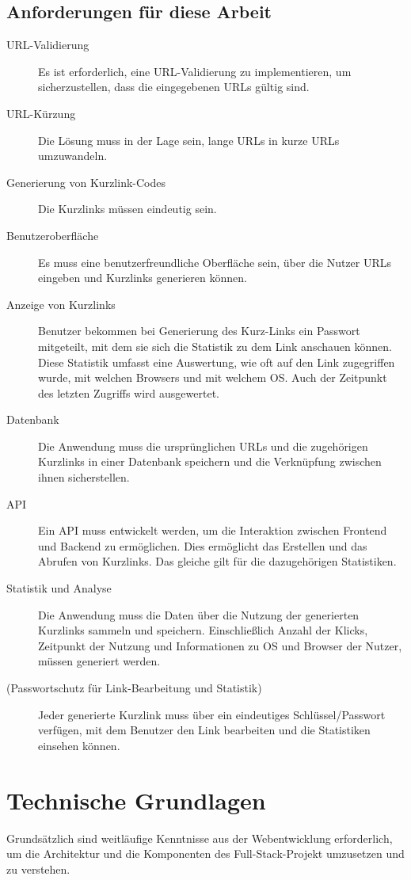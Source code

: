 \documentclass[a4paper,11pt,DIV=12,overfullrule=on]{scrreprt}%
\begin{document}
\section{Anforderungen für diese Arbeit}
\begin{description}
    \item[URL-Validierung] Es ist erforderlich, eine \ac{URL}-Validierung zu implementieren, um sicherzustellen, dass die eingegebenen \ac{URL}s gültig sind.
    \item[URL-Kürzung] Die Lösung muss in der Lage sein, lange \ac{URL}s in kurze \ac{URL}s umzuwandeln.
    \item[Generierung von Kurzlink-Codes] Die Kurzlinks müssen eindeutig sein.
    \item[Benutzeroberfläche] Es muss eine benutzerfreundliche Oberfläche sein, über die Nutzer \ac{URL}s eingeben und Kurzlinks generieren können.
    \item[Anzeige von Kurzlinks] Benutzer bekommen bei Generierung des Kurz-Links ein Passwort mitgeteilt, mit dem sie sich die Statistik zu dem Link anschauen können. Diese Statistik umfasst eine Auswertung, wie oft auf den Link zugegriffen wurde, mit welchen Browsers und mit welchem \ac{OS}. Auch der Zeitpunkt des letzten Zugriffs wird ausgewertet.
    \item[Datenbank] Die Anwendung muss die ursprünglichen \ac{URL}s und die zugehörigen Kurzlinks in einer Datenbank speichern und die Verknüpfung zwischen ihnen sicherstellen.
    \item[API] Ein \ac{API} muss entwickelt werden, um die Interaktion zwischen Frontend und Backend zu ermöglichen. Dies ermöglicht das Erstellen und das Abrufen von Kurzlinks. Das gleiche gilt für die dazugehörigen Statistiken.
    \item[Statistik und Analyse] Die Anwendung muss die Daten über die Nutzung der generierten Kurzlinks sammeln und speichern. Einschließlich Anzahl der Klicks, Zeitpunkt der Nutzung und Informationen zu \ac{OS} und Browser der Nutzer, müssen generiert werden.
    \item[(Passwortschutz für Link-Bearbeitung und Statistik)] Jeder generierte Kurzlink muss über ein eindeutiges Schlüssel/Passwort verfügen, mit dem Benutzer den Link bearbeiten und die Statistiken einsehen können.
\end{description}

\chapter{Technische Grundlagen}
Grundsätzlich sind weitläufige Kenntnisse aus der Webentwicklung erforderlich, um die Architektur und die Komponenten des Full-Stack-Projekt umzusetzen und zu verstehen.
\end{document}
